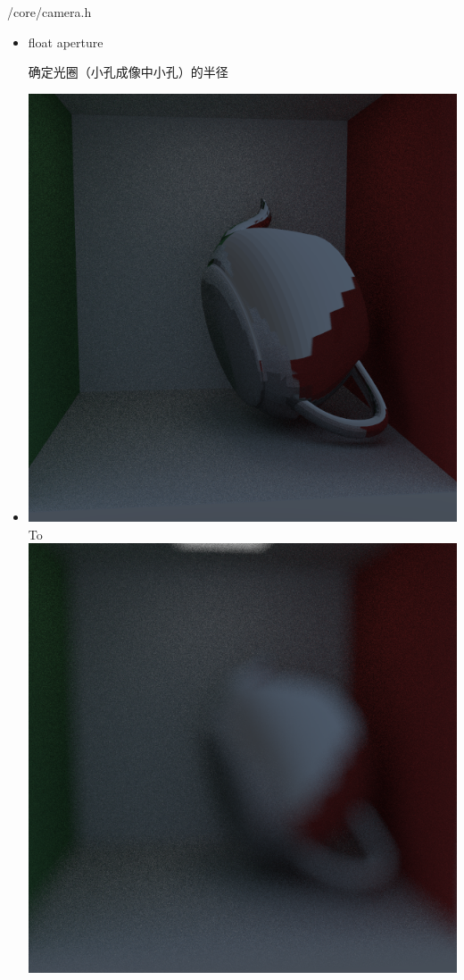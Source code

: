 \documentclass{beamer}
\begin{document}
\begin{frame} {/core/camera.h}
\begin{itemize}
\item 
\begin{semiverbatim} float aperture \end{semiverbatim}
确定光圈（小孔成像中小孔）的半径
\item \includegraphics[scale=0.2]{cornellbox_teapot_camera_move} \normalsize To 
\includegraphics[scale=0.2]{cornellbox_teapot_blur}
\end{itemize}
\end{frame}
\end{document}
